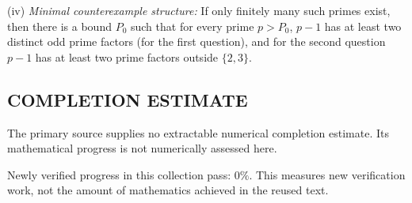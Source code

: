 (iv) \emph{Minimal counterexample structure:}
If only finitely many such primes exist, then there is a bound $P_0$ such that for every prime $p>P_0$, $p-1$ has at least two distinct odd prime factors (for the first question), and for the second question $p-1$ has at least two prime factors outside $\{2,3\}$.




\subsection*{COMPLETION ESTIMATE}
The primary source supplies no extractable numerical completion estimate. Its mathematical progress is not numerically assessed here.

Newly verified progress in this collection pass: $0\%$. This measures new verification work, not the amount of mathematics achieved in the reused text.
